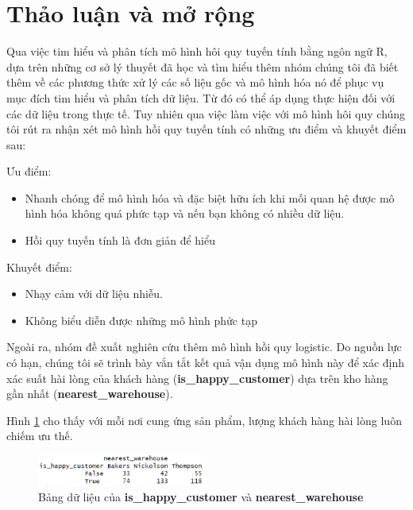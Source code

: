 \section{Thảo luận và mở rộng}
Qua việc tim hiểu và phân tích mô hình hôi quy tuyến tính bằng ngôn ngữ R, dựa trên những cơ sở lý thuyết đã học và tìm hiểu thêm nhóm chúng tôi đã biết thêm về các phương thức xử lý các số liệu gốc và mô hình hóa nó để phục vụ mục đích tim hiểu và phân tích dữ liệu. Từ đó có thể áp dụng thực hiện đối với các dữ liệu trong thực tế. Tuy nhiên qua việc làm việc với mô hình hôi quy chúng tôi rút ra nhận xét mô hình hồi quy tuyến tính có những ưu điểm và khuyết điểm sau:

Ưu điểm:
\begin{itemize}
    \item Nhanh chóng để mô hình hóa và đặc biệt hữu ích khi mối quan hệ được mô hình hóa không quá phức tạp và nếu bạn không có nhiều dữ liệu.
    \item Hồi quy tuyến tính là đơn giản để hiểu
\end{itemize}

Khuyết điểm:
\begin{itemize}
    \item Nhạy cảm với dữ liệu nhiễu.
    \item Không biểu diễn được những mô hình phức tạp
\end{itemize}

Ngoài ra, nhóm đề xuất nghiên cứu thêm mô hình hồi quy logistic. Do nguồn lực có hạn, chúng tôi sẽ trình bày vắn tắt kết quả vận dụng mô hình này để xác định xác suất hài lòng của khách hàng (\textbf{is\_happy\_customer}) dựa trên kho hàng gần nhất (\textbf{nearest\_warehouse}).

Hình \ref{fig:6.1} cho thấy với mỗi nơi cung ứng sản phẩm, lượng khách hàng hài lòng luôn chiếm ưu thế.
\begin{figure}[!htbp]
    \centering
    \includegraphics[width=0.5\textwidth]{graphics/mo_rong/f1.PNG}
    \caption{Bảng dữ liệu của \textbf{is\_happy\_customer} và \textbf{nearest\_warehouse}}
    \label{fig:6.1} 
\end{figure}


